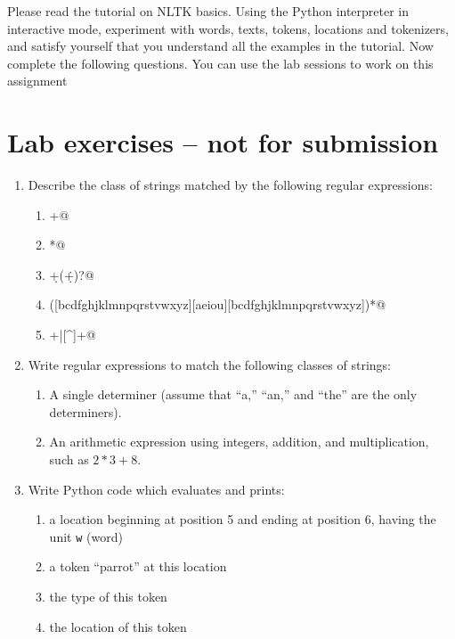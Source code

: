 \documentclass{460}
\begin{document}
\maketitle

Please read the tutorial on NLTK basics.
Using the Python interpreter in interactive mode, experiment
with words, texts, tokens, locations and tokenizers, and satisfy
yourself that you understand all the examples in the tutorial.
Now complete the following questions.
You can use the lab sessions to work on this assignment

\section*{Lab exercises -- not for submission}

\begin{enumerate}
\item
Describe the class of strings matched by the following regular expressions:

\begin{enumerate}
    \item \verb@[a-zA-Z]+@
    \item \verb@[A-Z][a-z]*@
    \item \verb@\d+(\.\d+)?@
    \item \verb@([bcdfghjklmnpqrstvwxyz][aeiou][bcdfghjklmnpqrstvwxyz])*@
    \item \verb@\w+|[^\w\s]+@
\end{enumerate}

\item
Write regular expressions to match the following classes of strings:

\begin{enumerate}
    \item A single determiner (assume that ``a,'' ``an,'' and ``the''
    are the only determiners).  
    \item An arithmetic expression using integers, addition, and
    multiplication, such as $2*3+8$.
\end{enumerate}

\item
Write Python code which evaluates and prints:

\begin{enumerate}
    \item a location beginning at position 5 and ending at position 6,
      having the unit \texttt{w} (word)
    \item a token ``parrot'' at this location
    \item the type of this token
    \item the location of this token
\end{enumerate}
\end{enumerate}
\end{document}
